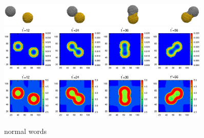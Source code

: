 \documentclass[aps,pre,preprint]{revtex4}
\begin{document}
\begin{figure}
  \centering
  \includegraphics[width=0.90\textwidth]{fig/error-rcut-ball.eps} 
  \includegraphics[width=0.90\textwidth]{fig/error-rcut.eps}
  \caption{normal words}
  \label{fig:tmp4}
\end{figure}
\end{document}
